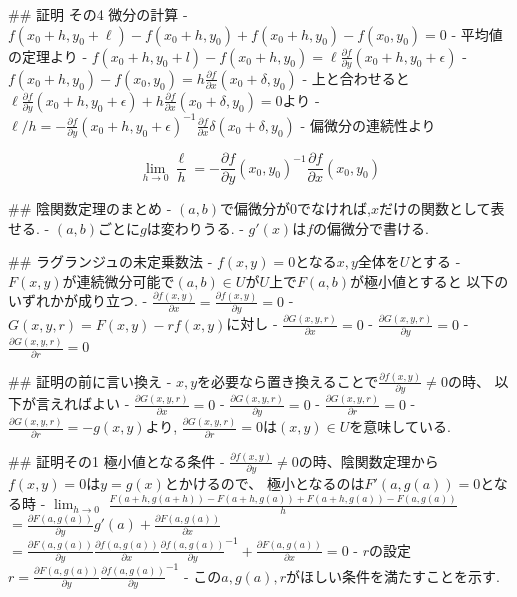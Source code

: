 \documentclass{ujarticle}
\begin{document}
## 証明 その4 微分の計算
- $f(x_0 + h, y_0 + \ell) - f(x_0 + h, y_0) + f(x_0+ h, y_0) - f(x_0, y_0) = 0$
- 平均値の定理より
  - $f(x_0 + h, y_0 + l) - f(x_0 + h, y_0) = \ell \frac{\partial f}{\partial y}(x_0 + h, y_0 + \epsilon)$
  - $f(x_0+ h, y_0) - f(x_0, y_0) = h \frac{\partial f}{\partial x} (x_0 + \delta ,y_0)$
- 上と合わせると$\ell \frac{\partial f}{\partial y}(x_0 + h, y_0 + \epsilon) + h \frac{\partial f}{\partial x }(x_0 + \delta ,y_0) = 0$より
- $\ell / h = - \frac{\partial f}{\partial y}(x_0 + h, y_0 + \epsilon)^{-1} \frac{\partial f}{\partial x}\delta (x_0 + \delta ,y_0)$
- 偏微分の連続性より

  $$\lim_{h \to 0} \frac{\ell}{h} = - \frac{\partial f}{\partial y}(x_0, y_0)^{-1} \frac{\partial f}{\partial x} (x_0, y_0)$$

## 陰関数定理のまとめ
- $(a, b)$で偏微分が0でなければ,$x$だけの関数として表せる.
- $(a, b)$ごとに$g$は変わりうる.
- $g'(x)$は$f$の偏微分で書ける.

## ラグランジュの未定乗数法
- $f(x ,y) = 0$となる$x, y$全体を$U$とする
- $F(x, y)$が連続微分可能で$(a, b) \in U$が$U$上で$F(a, b)$が極小値とすると
  以下のいずれかが成り立つ.
  - $\frac{\partial f(x, y)}{\partial x} = \frac{\partial f(x, y)}{\partial y} = 0$
  - $G(x, y, r) = F(x, y) - r f(x, y)$に対し
    - $\frac{\partial G(x, y, r)}{\partial x} = 0$
    - $\frac{\partial G(x, y, r)}{\partial y} = 0$
    - $\frac{\partial G(x, y, r)}{\partial r} = 0$

## 証明の前に言い換え
- $x, y$を必要なら置き換えることで$\frac{\partial f(x, y)}{\partial y} \neq 0$の時、
  以下が言えればよい
  - $\frac{\partial G(x, y, r)}{\partial x} = 0$
  - $\frac{\partial G(x, y, r)}{\partial y} = 0$
  - $\frac{\partial G(x, y, r)}{\partial r} = 0$
- $\frac{\partial G(x, y, r)}{\partial r} = - g(x, y)$より,
  $\frac{\partial G(x, y, r)}{\partial r} = 0$は$(x ,y) \in U$を意味している.

## 証明その1 極小値となる条件
- $\frac{\partial f(x, y)}{\partial y} \neq 0$の時、陰関数定理から
  $f(x, y) = 0$は$y = g(x)$とかけるので、
  極小となるのは$F'(a, g(a)) = 0$となる時
- $\displaystyle \lim_{h \to 0}$ $\frac{F(a + h, g(a+h)) - F(a+h, g(a)) + F(a+h, g(a)) - F(a,g(a))}{h}$
  $= \frac{\partial F(a, g(a))}{\partial y} g'(a) + \frac{\partial F(a, g(a))}{\partial x}$
  $= \frac{\partial F(a, g(a))}{\partial y} \frac{\partial f(a, g(a))}{\partial x} \frac{\partial f(a, g(a))}{\partial y}^{-1} + \frac{\partial F(a, g(a))}{\partial x} = 0$
- $r$の設定
  $r= \frac{\partial F(a, g(a))}{\partial y} \frac{\partial f(a, g(a))}{\partial y}^{-1}$
- この$a, g(a), r$がほしい条件を満たすことを示す.
\end{document}
